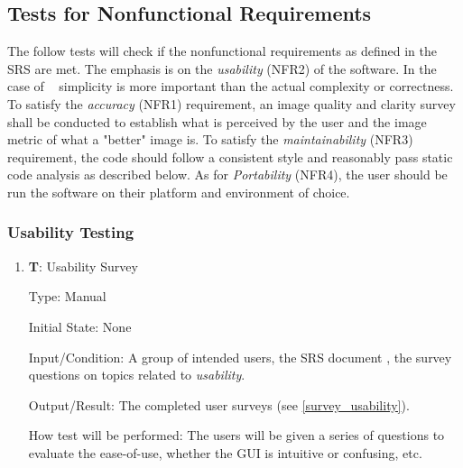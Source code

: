 \documentclass[12pt, titlepage]{article}
\newcounter{testnum} %
\begin{document}
\subsection{Tests for Nonfunctional Requirements}

The follow tests will check if the nonfunctional requirements as defined in the SRS \citep{SRS} are 
met. The emphasis is on the \textit{usability} (NFR2) of the software. In the case of \progname~
simplicity is more important than the actual complexity or correctness.
To satisfy the \textit{accuracy} (NFR1) requirement, an image quality and clarity survey shall be
conducted to establish what is perceived by the user and the image metric of what 
a "better" image is. To satisfy the \textit{maintainability} (NFR3) requirement, the code should 
follow a consistent style and reasonably pass static code analysis as described below.
As for \textit{Portability} (NFR4), the user should be run the software on their platform and 
environment of choice.

\subsubsection{Usability Testing}
\begin{enumerate}

  \item{\textbf{T\thetestnum \label{T_surveyUsability}}: Usability Survey\\}

  Type: Manual
            
  Initial State: None
            
  Input/Condition: A group of intended users, the SRS document \citep{SRS}, 
  the survey questions on topics related to \textit{usability}.
            
  Output/Result: The completed user surveys (see \ref{survey_usability}).
            
  How test will be performed: The users will be given a series of questions to evaluate the 
  ease-of-use, whether the GUI is intuitive or confusing, etc.

\end{enumerate}
\end{document}
